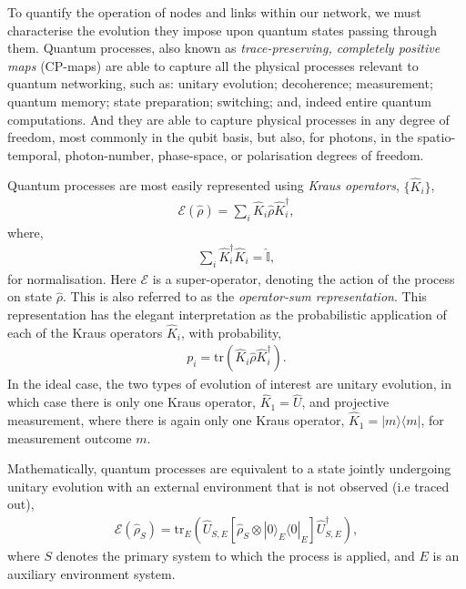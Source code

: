 \documentclass[aps,rmp,twocolumn,amsmath,amssymb,nofootinbib,superscriptaddress,longbibliography,floatfix,table-of-contents,eqsecnum]{revtex4-1}
\newcommand{\bra}[1]{\langle#1|}
\newcommand{\ket}[1]{|#1\rangle}
\begin{document}
To quantify the operation of nodes and links within our network, we must characterise the evolution they impose upon quantum states passing through them. Quantum processes, also known as \textit{trace-preserving, completely positive maps} (CP-maps) are able to capture all the physical processes relevant to quantum networking, such as: unitary evolution; decoherence; measurement; quantum memory; state preparation; switching; and, indeed entire quantum computations. And they are able to capture physical processes in any degree of freedom, most commonly in the qubit basis, but also, for photons, in the spatio-temporal, photon-number, phase-space, or polarisation degrees of freedom.

Quantum processes are most easily represented using \textit{Kraus operators}, $\{\hat{K}_i\}$,
\begin{align} \label{eq:kraus_rep}
\mathcal{E}(\hat\rho) = \sum_i \hat{K}_i \hat\rho \hat{K}_i^\dag,
\end{align}
where,
\begin{align}
\sum_i \hat{K}_i^\dag \hat{K}_i = \hat{\mathbb{I}},
\end{align}
for normalisation. Here $\mathcal{E}$ is a super-operator, denoting the action of the process on state $\hat\rho$. This is also referred to as the \textit{operator-sum representation}. This representation has the elegant interpretation as the probabilistic application of each of the Kraus operators $\hat{K}_i$, with probability,
\begin{align}
p_i = \text{tr}(\hat{K}_i \hat\rho \hat{K}_i^\dag).
\end{align}
In the ideal case, the two types of evolution of interest are unitary evolution, in which case there is only one Kraus operator, \mbox{$\hat{K}_1=\hat{U}$}, and projective measurement, where there is again only one Kraus operator, \mbox{$\hat{K}_1=\ket{m}\bra{m}$}, for measurement outcome $m$.

Mathematically, quantum processes are equivalent to a state jointly undergoing unitary evolution with an external environment that is not observed (i.e traced out),
\begin{align} \label{eq:proc_environment}
\mathcal{E}(\hat\rho_S) = \text{tr}_E (\hat{U}_{S,E} [\hat\rho_S\otimes \ket{0}_E\bra{0}_E] \hat{U}^\dag_{S,E}),
\end{align}
where $S$ denotes the primary system to which the process is applied, and $E$ is an auxiliary environment system.
\end{document}

